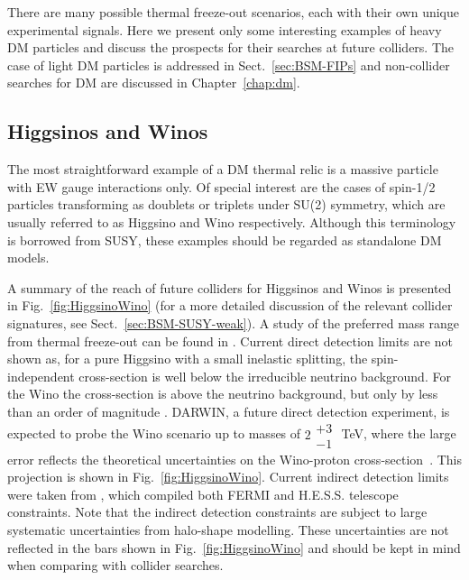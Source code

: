 \documentclass[../report.tex]{subfiles}
\begin{document}
There are many possible thermal freeze-out scenarios, each with their own unique experimental signals. Here we present only some interesting examples of heavy DM particles and discuss the prospects for their searches at future colliders. The case of light DM particles is addressed in Sect.~\ref{sec:BSM-FIPs} and non-collider searches for DM are discussed in Chapter~\ref{chap:dm}.

\subsection{Higgsinos and Winos}

The most straightforward example of a DM thermal relic is a massive particle with EW gauge interactions only. Of special interest are the cases of spin-1/2 particles transforming as doublets or triplets under SU(2) symmetry, which are usually referred to as Higgsino and Wino respectively. Although this terminology is borrowed from SUSY, these examples should be regarded as standalone DM models.

A summary of the reach of future colliders for Higgsinos and Winos is presented in Fig.~\ref{fig:HiggsinoWino} (for a more detailed discussion of the relevant collider signatures, see Sect.~\ref{sec:BSM-SUSY-weak}).  
A study of the preferred mass range from thermal freeze-out can be found in \cite{Krall:2017xij}.  Current direct detection limits are not shown as, for a pure Higgsino with a small inelastic splitting, the spin-independent cross-section is well below the irreducible neutrino background.  For the Wino the cross-section is above the neutrino background, but only by less than an order of magnitude \cite{Chen:2018uqz}.  DARWIN, a future direct detection experiment, is expected to probe the Wino scenario up to masses of $2\substack{+3 \\ -1}$ TeV, where the large error reflects the theoretical uncertainties on the Wino-proton cross-section~\cite{Chen:2018uqz}.  This projection is shown in Fig.~\ref{fig:HiggsinoWino}. Current indirect detection limits were taken from \cite{Krall:2017xij}, which compiled both FERMI and H.E.S.S. telescope constraints.  Note that the indirect detection constraints are subject to large systematic uncertainties from halo-shape modelling.  These uncertainties are not reflected in the bars shown in Fig.~\ref{fig:HiggsinoWino} and should be kept in mind when comparing with collider searches. 
\end{document}
